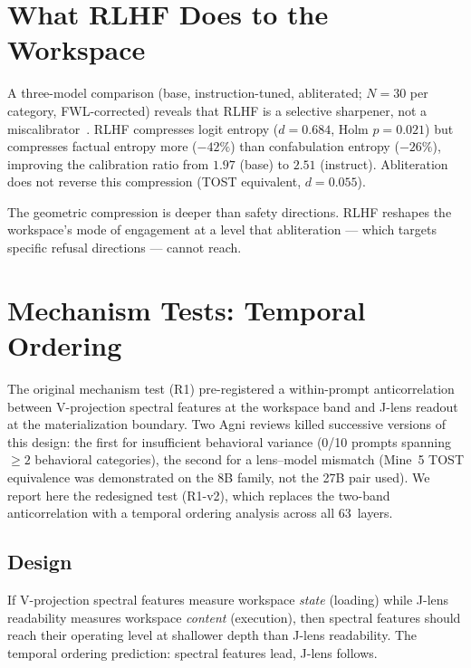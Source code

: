 \documentclass[11pt,a4paper]{article}
\begin{document}
\section{What RLHF Does to the Workspace}
\label{sec:rlhf}

A three-model comparison (base, instruction-tuned, abliterated;
$N{=}30$ per category, FWL-corrected) reveals that RLHF is a
selective sharpener, not a miscalibrator~\citep{lyra2026mine5}.
RLHF compresses logit entropy ($d{=}0.684$, Holm $p{=}0.021$) but
compresses factual entropy more ($-42\%$) than confabulation entropy
($-26\%$), improving the calibration ratio from $1.97$ (base) to
$2.51$ (instruct). Abliteration does not reverse this compression
(TOST equivalent, $d{=}0.055$).

The geometric compression is deeper than safety directions. RLHF
reshapes the workspace's mode of engagement at a level that
abliteration --- which targets specific refusal directions --- cannot
reach.

\section{Mechanism Tests: Temporal Ordering}
\label{sec:mechanism}

The original mechanism test (R1) pre-registered a within-prompt
anticorrelation between V-projection spectral features at the workspace
band and J-lens readout at the materialization boundary. Two Agni
reviews killed successive versions of this design: the first for
insufficient behavioral variance (0/10 prompts spanning ${\geq}2$
behavioral categories), the second for a lens--model mismatch (Mine~5
TOST equivalence was demonstrated on the 8B family, not the 27B pair
used). We report here the redesigned test (R1-v2), which replaces the
two-band anticorrelation with a temporal ordering analysis across all
63~layers.

\subsection{Design}

If V-projection spectral features measure workspace \emph{state}
(loading) while J-lens readability measures workspace \emph{content}
(execution), then spectral features should reach their operating level
at shallower depth than J-lens readability. The temporal ordering
prediction: spectral features lead, J-lens follows.
\end{document}

